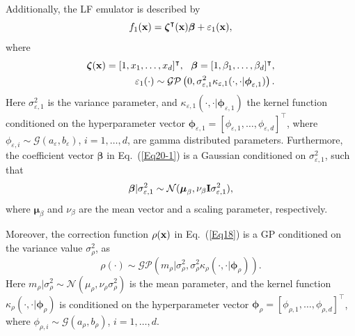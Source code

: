 \documentclass[iicol,sn-basic]{sn-jnl}%
\theoremstyle{thmstyleone}%
\theoremstyle{thmstyletwo}
\theoremstyle{thmstylethree}
\begin{document}
\begin{linenumbers}
Additionally, the LF emulator is described by
\begin{equation}\label{Eq19}
	f_1({\bf x}) = {\boldsymbol \zeta}^\intercal({\bf x}) {\boldsymbol \beta}+\varepsilon_1({\bf x}),
\end{equation}
where
\begin{subequations}\label{Eq20}
	\begin{align}
		{\boldsymbol \zeta}({\bf x})=[1,x_1,\dots,x_d]^\intercal, \ \ {\boldsymbol \beta}=[1,\beta_1,\dots,\beta_d]^\intercal
		\label{Eq20-1},\\
		\varepsilon_1(\cdot) \sim \mathcal{GP}\left(0,\sigma^2_{\varepsilon,1}\kappa_{\varepsilon,1}(\cdot,\cdot|{\boldsymbol \phi}_{\varepsilon,1})\right)
		\label{Eq20-2}.
	\end{align}
\end{subequations}
Here $\sigma^2_{\varepsilon,1}$ is the variance parameter, and $\kappa_{\varepsilon,1}(\cdot,\cdot|{\boldsymbol \phi}_{\varepsilon,1})$ the kernel function conditioned on the hyperparameter vector ${\boldsymbol \phi}_{\varepsilon,1} =[\phi_{\varepsilon,1},\dots,\phi_{\varepsilon,d}]^\intercal$, where $\phi_{\varepsilon,i} \sim \mathcal{G}(a_\varepsilon,b_\varepsilon)$, $i=1,\dots,d$, are gamma distributed parameters.
Furthermore, the coefficient vector ${\boldsymbol \beta}$ in Eq.~(\ref{Eq20-1}) is a Gaussian conditioned on $\sigma^2_{\varepsilon,1}$, such that
\begin{equation}\label{Eq21}
	{\boldsymbol \beta}|\sigma^2_{\varepsilon,1} \sim \mathcal{N}({\boldsymbol \mu}_\beta,\nu_\beta {\bf I} \sigma^2_{\varepsilon,1}),
\end{equation}
where ${\boldsymbol \mu}_\beta$ and $\nu_\beta$ are the mean vector and a scaling parameter, respectively.

Moreover, the correction function $\rho({\bf x})$ in Eq.~(\ref{Eq18}) is a GP conditioned on the variance value $\sigma^2_\rho$, as
\begin{equation}\label{Eq22}
	\rho(\cdot) \sim \mathcal{GP}\left(m_\rho|\sigma^2_\rho,\sigma^2_\rho\kappa_\rho(\cdot,\cdot|{\boldsymbol \phi}_\rho)\right).
\end{equation}
Here $m_\rho|\sigma^2_\rho \sim \mathcal{N}(\mu_\rho,\nu_\rho\sigma^2_\rho)$ is the mean parameter, and the kernel function $\kappa_\rho(\cdot,\cdot|{\boldsymbol \phi}_\rho)$ is conditioned on the hyperparameter vector ${\boldsymbol \phi}_\rho =[\phi_{\rho,1},\dots,\phi_{\rho,d}]^\intercal$, where $\phi_{\rho,i} \sim \mathcal{G}(a_\rho,b_\rho)$, $i=1,\dots,d.$ 


\end{linenumbers}
\end{document}
